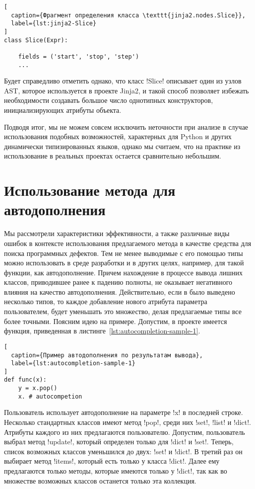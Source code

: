 \begin{lstlisting}[
  caption={Фрагмент определения класса \texttt{jinja2.nodes.Slice}},
  label={lst:jinja2-Slice}
]
class Slice(Expr):

    fields = ('start', 'stop', 'step')
    ...

\end{lstlisting}

Будет справедливо отметить однако, что класс !Slice! описывает один из узлов
AST, которое используется в проекте Jinja2, и такой способ позволяет избежать
необходимости создавать большое число однотипных конструкторов, инициализирующих
атрибуты объекта.

Подводя итог, мы не можем совсем исключить неточности при анализе в случае
использования подобных возможностей, характерных для Python и других динамически
типизированных языков, однако мы считаем, что на практике из использование в
реальных проектах остается сравнительно небольшим.

\section{Использование метода для автодополнения}
\label{sec:autocompletion-usage}

Мы рассмотрели характеристики эффективности, а также различные виды
ошибок в контексте использования предлагаемого метода в качестве средства для
поиска программных дефектов. Тем не менее выводимые с его помощью типы можно
использовать в среде разработки и в других целях, например, для такой функции,
как автодополнение.
Причем нахождение в процессе вывода лишних классов, приводившее ранее к падению
полноты, не оказывает негативного влияния на качество автодополнения.
Действительно, если в было выведено несколько типов, то каждое добавление
нового атрибута параметра пользователем, будет уменьшать это
множество, делая предлагаемые типы все более точными.  Поясним идею на
примере. Допустим, в проекте имеется функция, приведенная в
листинге~\ref{lst:autocompletion-sample-1}. 

\begin{lstlisting}[
  caption={Пример автодополнения по результатам вывода},
  label={lst:autocompletion-sample-1}
]
def func(x):
    y = x.pop()
    x. # autocompetion
\end{lstlisting}

Пользователь использует автодополнение на параметре !x! в последней строке.
Несколько стандартных классов имеют метод !pop!, среди них !set!, !list! и
!dict!. Атрибуты каждого из них предлагаются пользователю. Допустим,
пользователь выбрал метод !update!, который определен только для !dict! и
!set!. Теперь, список возможных классов уменьшился до двух: !set! и
!dict!. В третий раз он выбирает метод !items!, который есть только у класса
!dict!.  Далее ему предлагаются только методы, которые имеются только у !dict!,
так как во множестве возможных классов останется только эта коллекция.

